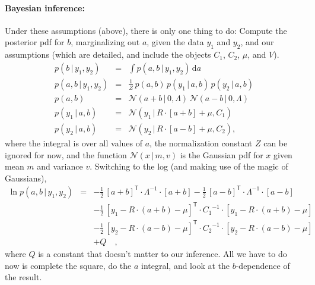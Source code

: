 \documentclass[12pt,letterpaper]{article}
\newcommand{\transpose}[1]{{#1}^{\mathsf{T}}}
\newcommand{\inverse}[1]{{#1}^{-1}}
\newcommand{\given}{\,|\,}
\newcommand{\dd}{\mathrm{d}}
\newcommand{\normal}{\mathcal{N}}
\begin{document}
\paragraph{Bayesian inference:}
Under these assumptions (above), there is only one thing to do:
Compute the posterior pdf for $b$, marginalizing out $a$, given the
data $y_1$ and $y_2$, and our assumptions (which are detailed, and
include the objects $C_1$, $C_2$, $\mu$, and $V$).
\begin{eqnarray}
p(b\given y_1,y_2) &=& \int p(a,b\given y_1,y_2)\,\dd a \\
p(a,b\given y_1,y_2) &=& \frac{1}{Z}\,p(a,b)\,p(y_1\given a,b)\,p(y_2\given a,b) \\
p(a,b) &=& \normal(a+b\given 0,\Lambda)\,\normal(a-b\given 0,\Lambda) \\
p(y_1\given a,b) &=& \normal(y_1\given R\cdot[a+b]+\mu,C_1) \\
p(y_2\given a,b) &=& \normal(y_2\given R\cdot[a-b]+\mu,C_2), \quad
\end{eqnarray}
where the integral is over all values of $a$, the normalization
constant $Z$ can be ignored for now, and the function $\normal(x\given
m,v)$ is the Gaussian pdf for $x$ given mean $m$ and variance
$v$. Switching to the log (and making use of the magic of Gaussians),
\begin{eqnarray}
\ln p(a,b\given y_1,y_2) &=&
  -\frac{1}{2}\,\transpose{[a+b]}\cdot\inverse{\Lambda}\cdot [a+b]
  -\frac{1}{2}\,\transpose{[a-b]}\cdot\inverse{\Lambda}\cdot [a-b] \nonumber\\
  &&
  -\frac{1}{2}\,\transpose{[y_1-R\cdot(a+b)-\mu]}\cdot\inverse{C_1}\cdot [y_1-R\cdot(a+b)-\mu] \nonumber\\
  &&
  -\frac{1}{2}\,\transpose{[y_2-R\cdot(a-b)-\mu]}\cdot\inverse{C_2}\cdot [y_2-R\cdot(a-b)-\mu] \nonumber\\
  &&
  + Q \quad ,
\end{eqnarray}
where $Q$ is a constant that doesn't matter to our inference. All we
have to do now is complete the square, do the $a$ integral, and look
at the $b$-dependence of the result.
\end{document}
